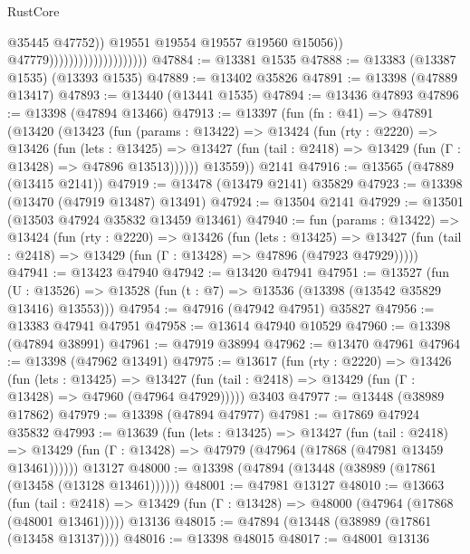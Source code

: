 \begin{lexlean}{RustCore}
\begin{coremodule}
                                                    @35445
                                                    @47752))
                                                @19551
                                                @19554
                                                @19557
                                                @19560
                                                @15056))
                                            @47779))))))))))))))))))))
@47884 := @13381 @1535
@47888 := @13383 (@13387 @1535) (@13393 @1535)
@47889 := @13402 @35826
@47891 := @13398 (@47889 @13417)
@47893 := @13440 (@13441 @1535)
@47894 := @13436 @47893
@47896 := @13398 (@47894 @13466)
@47913 := @13397
    (fun (fn : @41) =>
    @47891
      (@13420
        (@13423
          (fun (params : @13422) =>
          @13424
            (fun (rty : @2220) =>
            @13426
              (fun (lets : @13425) =>
              @13427 (fun (tail : @2418) => @13429 (fun (Γ : @13428) => @47896 @13513))))))
        @13559))
    @2141
@47916 := @13565 (@47889 (@13415 @2141))
@47919 := @13478 (@13479 @2141) @35829
@47923 := @13398 (@13470 (@47919 @13487) @13491)
@47924 := @13504 @2141
@47929 := @13501 (@13503 @47924 @35832 @13459 @13461)
@47940 := fun (params : @13422) =>
  @13424
    (fun (rty : @2220) =>
    @13426
      (fun (lets : @13425) =>
      @13427 (fun (tail : @2418) => @13429 (fun (Γ : @13428) => @47896 (@47923 @47929)))))
@47941 := @13423 @47940
@47942 := @13420 @47941
@47951 := @13527
    (fun (U : @13526) => @13528 (fun (t : @7) => @13536 (@13398 (@13542 @35829 @13416) @13553)))
@47954 := @47916 (@47942 @47951) @35827
@47956 := @13383 @47941 @47951
@47958 := @13614 @47940 @10529
@47960 := @13398 (@47894 @38991)
@47961 := @47919 @38994
@47962 := @13470 @47961
@47964 := @13398 (@47962 @13491)
@47975 := @13617
    (fun (rty : @2220) =>
    @13426
      (fun (lets : @13425) =>
      @13427 (fun (tail : @2418) => @13429 (fun (Γ : @13428) => @47960 (@47964 @47929)))))
    @3403
@47977 := @13448 (@38989 @17862)
@47979 := @13398 (@47894 @47977)
@47981 := @17869 @47924 @35832
@47993 := @13639
    (fun (lets : @13425) =>
    @13427
      (fun (tail : @2418) =>
      @13429 (fun (Γ : @13428) => @47979 (@47964 (@17868 (@47981 @13459 @13461))))))
    @13127
@48000 := @13398 (@47894 (@13448 (@38989 (@17861 (@13458 (@13128 @13461))))))
@48001 := @47981 @13127
@48010 := @13663
    (fun (tail : @2418) => @13429 (fun (Γ : @13428) => @48000 (@47964 (@17868 (@48001 @13461)))))
    @13136
@48015 := @47894 (@13448 (@38989 (@17861 (@13458 @13137))))
@48016 := @13398 @48015
@48017 := @48001 @13136

\end{coremodule}
\end{lexlean}
